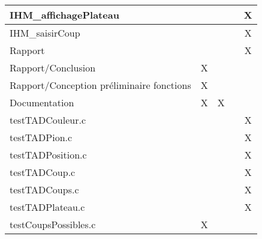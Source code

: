 \begin{table}[h]
\begin{tabular}{l|c|c|c|c|}
\multicolumn{1}{|l|}{IHM\_affichagePlateau}              &                       &                &                       & X                      \\ \hline
\multicolumn{1}{|l|}{IHM\_saisirCoup}                   &                       &                &                       & X                      \\ \hline
\multicolumn{1}{|l|}{Rapport}                           &                       &                &                       & X                      \\ \hline
\multicolumn{1}{|l|}{Rapport/Conclusion}                           & X                      &                &                       &                       \\ \hline
\multicolumn{1}{|l|}{Rapport/Conception préliminaire fonctions}                           & X                      &                &                       &                       \\ \hline
\multicolumn{1}{|l|}{Documentation}                     & X                      & X              &                       &                        \\ \hline
\multicolumn{1}{|l|}{testTADCouleur.c}                         &                       &                &                       & X                      \\ \hline
\multicolumn{1}{|l|}{testTADPion.c}                            &                       &                &                       & X                      \\ \hline
\multicolumn{1}{|l|}{testTADPosition.c}                        &                       &                &                       & X                      \\ \hline
\multicolumn{1}{|l|}{testTADCoup.c}                            &                       &                &                       & X                      \\ \hline
\multicolumn{1}{|l|}{testTADCoups.c}                           &                       &                &                       & X                      \\ \hline
\multicolumn{1}{|l|}{testTADPlateau.c}                         &                       &                &                       & X                      \\ \hline
\multicolumn{1}{|l|}{testCoupsPossibles.c}                     & X                     &                &                       &                        \\ \hline

\end{tabular}
\end{table}
